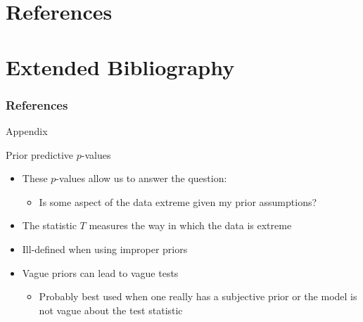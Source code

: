{
\section{References}
\section{Extended Bibliography}
\tiny
\begin{frame}
  \frametitle{References}
  
  
\end{frame}
}

\begin{frame}{Appendix}
\end{frame}

\begin{frame}{Prior predictive $p$-values}
  \begin{itemize}
    \item These $p$-values allow us to answer the question:
    \begin{itemize}
      \item Is some aspect of the data extreme given my prior assumptions?
    \end{itemize}
    \vspace{\baselineskip}
    \pause
    \item The statistic $T$ measures the way in which the data is extreme
    \vspace{\baselineskip}
    \pause
    \item Ill-defined when using improper priors 
    \vspace{\baselineskip}
    \pause
    \item Vague priors can lead to vague tests
    \begin{itemize}
      \item Probably best used when one really has a subjective prior or the model is not vague about the test statistic
    \end{itemize}
  \end{itemize}
\end{frame}

